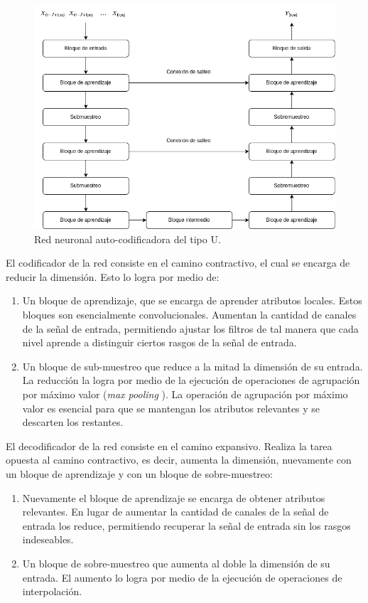 \begin{figure}
	\centering
	\centerline{\includegraphics[scale=0.65]{images/ch3/unet.png}}
	\caption{Red neuronal auto-codificadora del tipo U.}
	\label{fig:ch3_unet}
\end{figure}

El codificador de la red consiste en el camino contractivo, el cual se encarga de reducir la dimensión. Esto lo logra por medio de:

\begin{enumerate}
	\item Un bloque de aprendizaje, que se encarga de aprender atributos locales. Estos bloques son esencialmente convolucionales. Aumentan la cantidad de canales de la señal de entrada, permitiendo ajustar los filtros de tal manera que cada nivel aprende a distinguir ciertos rasgos de la señal de entrada.
	
	\item Un bloque de sub-muestreo que reduce a la mitad la dimensión de su entrada. La reducción la logra por medio de la ejecución de operaciones de agrupación por máximo valor (\emph{max pooling} \cite{deep_learning}). La operación de agrupación por máximo valor es esencial para que se mantengan los atributos relevantes y se descarten los restantes.
\end{enumerate}

El decodificador de la red consiste en el camino expansivo. Realiza la tarea opuesta al camino contractivo, es decir, aumenta la dimensión, nuevamente con un bloque de aprendizaje y con un bloque de sobre-muestreo:


\begin{enumerate}
	\item Nuevamente el bloque de aprendizaje se encarga de obtener atributos relevantes. En lugar de aumentar la cantidad de canales de la señal de entrada los reduce, permitiendo recuperar la señal de entrada sin los rasgos indeseables.
	
	\item Un bloque de sobre-muestreo que aumenta al doble la dimensión de su entrada. El aumento lo logra por medio de la ejecución de operaciones de interpolación.
\end{enumerate}

